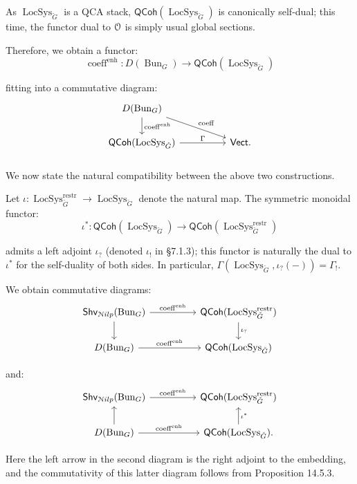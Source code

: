\documentclass[reqno,11pt]{amsart}
\numberwithin{equation}{subsection}
\theoremstyle{remark}
\newcommand{\sN}{{\EuScript N}}
\newcommand{\sO}{{\EuScript O}}
\newcommand{\on}{\operatorname}
\newcommand{\Vect}{\mathsf{Vect}}
\newcommand{\Bun}{\on{Bun}}
\newcommand{\LocSys}{\on{LocSys}}
\newcommand{\QCoh}{\mathsf{QCoh}}
\newcommand{\coeff}{\on{coeff}}
\newcommand{\enh}{\on{enh}}
\newcommand{\Shv}{\mathsf{Shv}}
\newcommand{\Nilp}{\sN ilp}
\begin{document}
As $\LocSys_{\check{G}}$ is a QCA stack, $\QCoh(\LocSys_{\check{G}})$
is canonically self-dual; this time, the functor dual to 
$\sO$ is simply usual global sections.

Therefore, we obtain a functor:
\[
\coeff^{\enh}:D(\Bun_G) \to \QCoh(\LocSys_{\check{G}})
\]

\noindent fitting into a commutative diagram:
%
\[
\begin{tikzcd}
D(\Bun_G)
\arrow[d,"\coeff^{\enh}"]
\arrow[drr,"\coeff"]
\\
\QCoh(\LocSys_{\check{G}})
\arrow[rr,"\Gamma"]
&&
\Vect.
\end{tikzcd}
\]

\subsubsection{}\label{sss:coeff-enh-compats}

We now state the natural compatibility between the above two constructions.

Let $\iota:\LocSys_{\check{G}}^{\on{restr}} \to \LocSys_{\check{G}}$
denote the natural map. The symmetric monoidal functor:
%
\[
\iota^*:\QCoh(\LocSys_{\check{G}}) \to \QCoh(\LocSys_{\check{G}}^{\on{restr}})
\]

\noindent admits a left adjoint $\iota_?$ (denoted $\iota_!$ in 
\cite{agkrrv1} \S 7.1.3); this functor is naturally the
dual to $\iota^*$ for the self-duality of both sides.
In particular, $\Gamma(\LocSys_{\check{G}},\iota_?(-)) = \Gamma_!$.

We obtain commutative diagrams:
%
\[
\begin{tikzcd}
\Shv_{\Nilp}(\Bun_G)
\arrow[rr,"\coeff^{\enh}"]
\arrow[d]
&&
\QCoh(\LocSys_{\check{G}}^{\on{restr}})
\arrow[d,"\iota_?"]
\\
D(\Bun_G)
\arrow[rr,"\coeff^{\enh}"]
&&
\QCoh(\LocSys_{\check{G}})
\end{tikzcd}
\]

\noindent and:
%
\[
\begin{tikzcd}
\Shv_{\Nilp}(\Bun_G)
\arrow[rr,"\coeff^{\enh}"]
&&
\QCoh(\LocSys_{\check{G}}^{\on{restr}})
\\
D(\Bun_G)
\arrow[rr,"\coeff^{\enh}"]
\arrow[u]
&&
\QCoh(\LocSys_{\check{G}})
\arrow[u,"\iota^*",swap].
\end{tikzcd}
\]

\noindent Here the left arrow in the second diagram is
the right adjoint to the embedding, and the commutativity of
this latter diagram follows from \cite{agkrrv1} Proposition 14.5.3.
\end{document}
